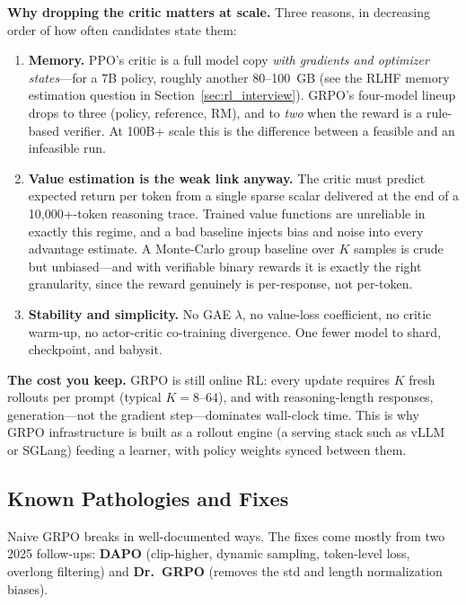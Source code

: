 \textbf{Why dropping the critic matters at scale.} Three reasons, in decreasing order of how often candidates state them:
\begin{enumerate}
    \item \textbf{Memory.} PPO's critic is a full model copy \textit{with gradients and optimizer states}---for a 7B policy, roughly another 80--100~GB (see the RLHF memory estimation question in Section~\ref{sec:rl_interview}). GRPO's four-model lineup drops to three (policy, reference, RM), and to \textit{two} when the reward is a rule-based verifier. At 100B+ scale this is the difference between a feasible and an infeasible run.
    \item \textbf{Value estimation is the weak link anyway.} The critic must predict expected return per token from a single sparse scalar delivered at the end of a 10{,}000+-token reasoning trace. Trained value functions are unreliable in exactly this regime, and a bad baseline injects bias and noise into every advantage estimate. A Monte-Carlo group baseline over $K$ samples is crude but unbiased---and with verifiable binary rewards it is exactly the right granularity, since the reward genuinely is per-response, not per-token.
    \item \textbf{Stability and simplicity.} No GAE $\lambda$, no value-loss coefficient, no critic warm-up, no actor-critic co-training divergence. One fewer model to shard, checkpoint, and babysit.
\end{enumerate}

\textbf{The cost you keep.} GRPO is still online RL: every update requires $K$ fresh rollouts per prompt (typical $K = 8$--$64$), and with reasoning-length responses, generation---not the gradient step---dominates wall-clock time. This is why GRPO infrastructure is built as a rollout engine (a serving stack such as vLLM or SGLang) feeding a learner, with policy weights synced between them.

\subsection{Known Pathologies and Fixes}

Naive GRPO breaks in well-documented ways. The fixes come mostly from two 2025 follow-ups: \textbf{DAPO} (clip-higher, dynamic sampling, token-level loss, overlong filtering) and \textbf{Dr.~GRPO} (removes the std and length normalization biases).


